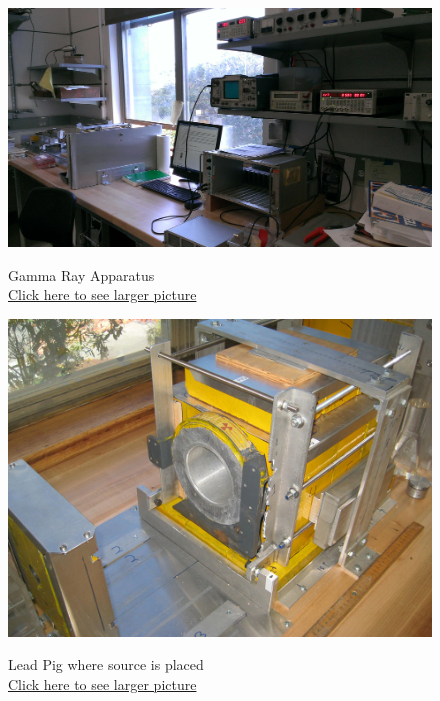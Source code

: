 \documentclass{../lab}
\begin{document}
\noindent
\begin{figure}[H]
  \href{http://experimentationlab.berkeley.edu/sites/default/files/images/Gma_t1.jpg}{\includegraphics[width=\linewidth,keepaspectratio]{images/Gma_t1.jpg}}
  \caption{Gamma Ray Apparatus \\ \href{http://experimentationlab.berkeley.edu/sites/default/files/images/Gma_t1.jpg}{Click here to see larger picture}}
  \label{fig:Apparatus}
\endminipage\hfill
{}
  \href{http://experimentationlab.berkeley.edu/sites/default/files/images/GMA_Pig_3536-Lg.jpg}{\includegraphics[width=\linewidth,keepaspectratio]{images/GMA_Pig_3536-Lg.jpg}}
  \caption{Lead Pig where source is placed \\
  \href{http://experimentationlab.berkeley.edu/sites/default/files/images/GMA_Pig_3536-Lg.jpg}{Click here to see larger picture}}
  \label{fig:LeadPig}
\endminipage\hfill
{}

\end{figure}
\end{document}
